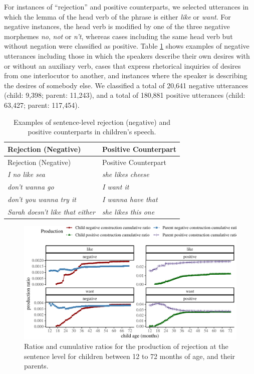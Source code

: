 \documentclass[
  english,
  man,floatsintext]{apa6}
\begin{document}
For instances of ``rejection'' and positive counterparts, we selected utterances in which the lemma of the head verb of the phrase is either \emph{like} or \emph{want}. For negative instances, the head verb is modified by one of the three negative morphemes \emph{no}, \emph{not} or \emph{n't}, whereas cases including the same head verb but without negation were classified as positive. Table \ref{tab:rejection} shows examples of negative utterances including those in which the speakers describe their own desires with or without an auxiliary verb, cases that express rhetorical inquiries of desires from one interlocutor to another, and instances where the speaker is describing the desires of somebody else. We classified a total of 20,641 negative utterances (child: 9,398; parent: 11,243), and a total of 180,881 positive utterances (child: 63,427; parent: 117,454).

\begin{longtable}[]{@{}ll@{}}
\caption{\label{tab:rejection} Examples of sentence-level rejection (negative) and positive counterparts in children's speech.}\tabularnewline
\toprule
Rejection (Negative) & Positive Counterpart \\
\midrule
\endfirsthead
\toprule
Rejection (Negative) & Positive Counterpart \\
\midrule
\endhead
\emph{I no like sea} & \emph{she likes cheese} \\
\emph{don't wanna go} & \emph{I want it} \\
\emph{don't you wanna try it} & \emph{I wanna have that} \\
\emph{Sarah doesn't like that either} & \emph{she likes this one} \\
\bottomrule
\end{longtable}

\begin{figure}[H]

{\centering \includegraphics{neg_construction_article_files/figure-latex/emotion-1} 

}

\caption{Ratios and cumulative ratios for the production of rejection at the sentence level for children between 12 to 72 months of age, and their parents.}\label{fig:emotion}
\end{figure}
\end{document}
